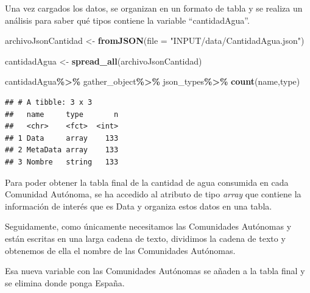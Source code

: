 \documentclass[
]{article}
\newenvironment{Shaded}{\begin{snugshade}}{\end{snugshade}}
\newcommand{\AttributeTok}[1]{\textcolor[rgb]{0.13,0.29,0.53}{#1}}
\newcommand{\FunctionTok}[1]{\textcolor[rgb]{0.13,0.29,0.53}{\textbf{#1}}}
\newcommand{\NormalTok}[1]{#1}
\newcommand{\OtherTok}[1]{\textcolor[rgb]{0.56,0.35,0.01}{#1}}
\newcommand{\SpecialCharTok}[1]{\textcolor[rgb]{0.81,0.36,0.00}{\textbf{#1}}}
\newcommand{\StringTok}[1]{\textcolor[rgb]{0.31,0.60,0.02}{#1}}
\begin{document}
Una vez cargados los datos, se organizan en un formato de tabla y se
realiza un análisis para saber qué tipos contiene la variable
``cantidadAgua''.

\begin{Shaded}
\begin{Highlighting}[]
\NormalTok{archivoJsonCantidad }\OtherTok{\textless{}{-}} \FunctionTok{fromJSON}\NormalTok{(}\AttributeTok{file =} \StringTok{"INPUT/data/CantidadAgua.json"}\NormalTok{)}

\NormalTok{cantidadAgua }\OtherTok{\textless{}{-}} \FunctionTok{spread\_all}\NormalTok{(archivoJsonCantidad)}

\NormalTok{cantidadAgua}\SpecialCharTok{\%\textgreater{}\%}
\NormalTok{  gather\_object}\SpecialCharTok{\%\textgreater{}\%}
\NormalTok{  json\_types}\SpecialCharTok{\%\textgreater{}\%}
  \FunctionTok{count}\NormalTok{(name,type)}
\end{Highlighting}
\end{Shaded}

\begin{verbatim}
## # A tibble: 3 x 3
##   name     type       n
##   <chr>    <fct>  <int>
## 1 Data     array    133
## 2 MetaData array    133
## 3 Nombre   string   133
\end{verbatim}

Para poder obtener la tabla final de la cantidad de agua consumida en
cada Comunidad Autónoma, se ha accedido al atributo de tipo \emph{array}
que contiene la información de interés que es Data y organiza estos
datos en una tabla.

Seguidamente, como únicamente necesitamos las Comunidades Autónomas y
están escritas en una larga cadena de texto, dividimos la cadena de
texto y obtenemos de ella el nombre de las Comunidades Autónomas.

Esa nueva variable con las Comunidades Autónomas se añaden a la tabla
final y se elimina donde ponga España.
\end{document}
